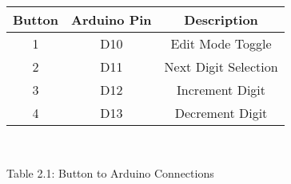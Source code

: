 \centering
\begin{tabular}{|c|c|c|}
\hline
Button & Arduino Pin & Description\\
\hline
1 & D10 & Edit Mode Toggle\\
\hline
2 & D11 & Next Digit Selection\\
\hline
3 & D12  & Increment Digit\\
\hline
4 & D13  & Decrement Digit\\
\hline

\end{tabular}\\
\centerline{Table 2.1: Button to Arduino Connections}
